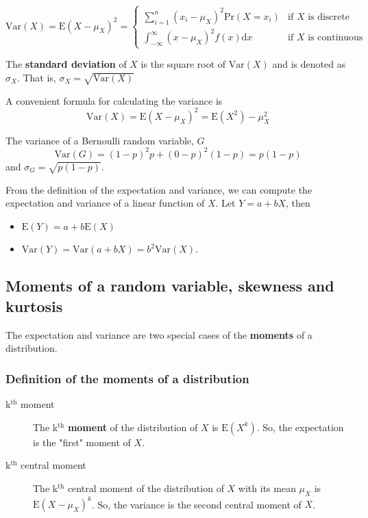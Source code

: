 \documentclass[a4paper,11pt]{article}
\begin{document}
\begin{equation*}
\mathrm{Var}(X) = \mathrm{E}(X-\mu_X)^{2}=
\begin{cases}
\sum_{i=1}^n (x_i - \mu_X)^{2}\mathrm{Pr}(X = x_i) & \text{if } X \text{ is discrete} \\
\int_{-\infty}^{\infty} (x - \mu_X)^{2}f(x)\mathrm{d} x  & \text{if } X \text{ is continuous}
\end{cases}
\end{equation*}

The \textbf{standard deviation} of \(X\) is the square root of
\(\mathrm{Var}(X)\) and is denoted as \(\sigma_{X}\). That is,
\(\sigma_{X} = \sqrt{\mathrm{Var}(X)}\)

A convenient formula for calculating the variance is
\[ \mathrm{Var}(X) = \mathrm{E}(X - \mu_X)^{2} = \mathrm{E}(X^{2}) - \mu_X^{2} \]

The variance of a Bernoulli random variable, \(G\)
\[ \mathrm{Var}(G) = (1-p)^{2}p + (0-p)^{2}(1-p) = p(1-p) \] and \(\sigma_{G} =
\sqrt{p(1-p)}\).

From the definition of the expectation and variance, we can compute
the expectation and variance of a linear function of \(X\). Let \(Y = a +
bX\), then
\begin{itemize}
\item \(\mathrm{E}(Y) = a + b\mathrm{E}(X)\)
\item \(\mathrm{Var}(Y) = \mathrm{Var}(a + b X) = b^{2} \mathrm{Var}(X)\).
\end{itemize}


\subsection{Moments of a random variable, skewness and kurtosis}
\label{sec:org6e257ab}

The expectation and variance are two special cases of the \textbf{moments} of
a distribution.

\subsubsection*{Definition of the moments of a distribution}
\label{sec:orgfb9b0d4}

\begin{description}
\item[{k\(^{\text{th}}\) moment}] The k\(^{\text{th}}\) \textbf{moment} of the distribution of \(X\) is
\(\mathrm{E}(X^{k})\). So, the expectation is the "first"
moment of \(X\).

\item[{k\(^{\text{th}}\) central moment}] The k\(^{\text{th}}\) central moment of the distribution
of \(X\) with its mean \(\mu_X\) is \(\mathrm{E}(X - \mu_X)^{k}\). So, the
variance is the second central moment of \(X\).
\end{description}
\end{document}
